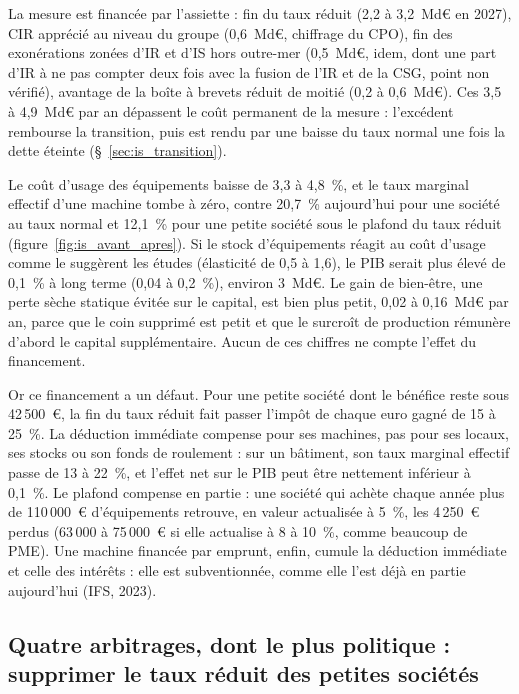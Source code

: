 La mesure est financée par l'assiette : fin du taux réduit (2,2 à 3,2~Md€ en 2027), CIR apprécié au niveau du groupe
(0,6~Md€, chiffrage du CPO), fin des exonérations zonées d'IR et d'IS hors outre-mer (0,5~Md€, idem, dont une part
d'IR à ne pas compter deux fois avec la fusion de l'IR et de la CSG, point non vérifié), avantage de la boîte à brevets
réduit de moitié (0,2 à 0,6~Md€). Ces 3,5 à 4,9~Md€ par an dépassent le coût permanent de la
mesure : l'excédent rembourse la transition, puis est rendu par une baisse du taux normal une fois la dette éteinte
(§~\ref{sec:is_transition}).

Le coût d'usage des équipements baisse de 3,3 à 4,8~\%, et le taux marginal effectif d'une machine tombe à zéro,
contre 20,7~\% aujourd'hui pour une société au taux normal et 12,1~\% pour une petite société sous le plafond du taux
réduit (figure~\ref{fig:is_avant_apres}). Si le stock d'équipements réagit au coût d'usage comme le suggèrent les
études (élasticité de 0,5 à 1,6), le PIB serait plus élevé de 0,1~\% à long terme (0,04 à 0,2~\%), environ 3~Md€. Le
gain de bien-être, une perte sèche statique évitée sur le capital, est bien plus petit, 0,02 à 0,16~Md€ par an, parce
que le coin supprimé est petit et que le surcroît de production rémunère d'abord le capital supplémentaire. Aucun de
ces chiffres ne compte l'effet du financement.


Or ce financement a un défaut. Pour une petite société dont le bénéfice reste sous 42\,500~€, la fin du taux réduit
fait passer l'impôt de chaque euro gagné de 15 à 25~\%. La déduction immédiate compense pour ses machines, pas pour ses
locaux, ses stocks ou son fonds de roulement : sur un bâtiment, son taux marginal effectif passe de 13 à 22~\%, et
l'effet net sur le PIB peut être nettement inférieur à 0,1~\%. Le plafond compense en partie : une société qui achète
chaque année plus de 110\,000~€ d'équipements retrouve, en valeur actualisée à 5~\%, les 4\,250~€ perdus (63\,000 à
75\,000~€ si elle actualise à 8 à 10~\%, comme beaucoup de PME). Une machine financée par emprunt, enfin, cumule la
déduction immédiate et celle des intérêts : elle est subventionnée, comme elle l'est déjà en partie aujourd'hui (IFS,
2023).

\subsection{Quatre arbitrages, dont le plus politique : supprimer le taux réduit des petites sociétés}\label{sec:is_arbitrages}

